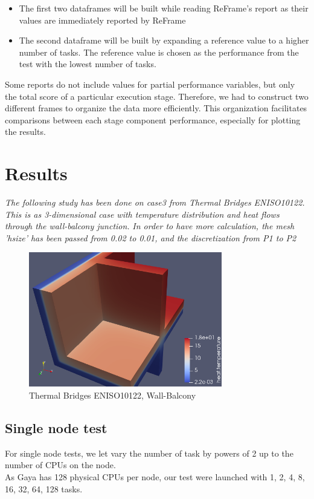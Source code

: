 \documentclass[12pt]{article}
\begin{document}
\begin{itemize}
    \item The first two dataframes will be built while reading ReFrame's report as their values are immediately reported by ReFrame
    \item The second dataframe will be built by expanding a reference value to a higher number of tasks.
    The reference value is chosen as the performance from the test with the lowest number of tasks.
\end{itemize}

Some reports do not include values for partial performance variables, but only the total score of a particular execution stage.
Therefore, we had to construct two different frames to organize the data more efficiently.
This organization facilitates comparisons between each stage component performance, especially for plotting the results.


\section{Results}

\textit{The following study has been done on case3 from Thermal Bridges ENISO10122. This is as 3-dimensional case with temperature distribution and heat flows through the wall-balcony junction.}
\textit{In order to have more calculation, the mesh 'hsize' has been passed from 0.02 to 0.01, and the discretization from P1 to P2}

\begin{figure}[h]
    \centering
    \includegraphics[width=0.3\linewidth]{../illustrations/balcony.png}
    \scriptsize{\caption{Thermal Bridges ENISO10122, Wall-Balcony\cite*{Feel++}}}
\end{figure}

\subsection{Single node test}
For single node tests, we let vary the number of task by powers of 2 up to the number of CPUs on the node. \\
As Gaya has 128 physical CPUs per node, our test were launched with 1, 2, 4, 8, 16, 32, 64, 128 tasks.
\end{document}
